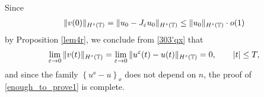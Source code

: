 Since 
\begin{equation*}
	\label{303''qx}
	\begin{split}
		\|v(0)\|_{H^s(\mathbb{T})} = \|u_0 - J_\varepsilon u_0 \|_{H^s(\mathbb{T})} \le
		\|u_0\|_{H^s(\mathbb{T})} \cdot o(1)
	\end{split}
\end{equation*}
by Proposition \ref{lem4r}, we conclude from \eqref{303'qx} that
\begin{equation}
	\label{304qx}
	\begin{split}
		\lim_{\varepsilon \to 0} \|v(t)\|_{H^s(\mathbb{T})} = \lim_{\varepsilon \to 0}
		\|u^\varepsilon(t) - u(t)\|_{H^s(\mathbb{T})}= 0, \qquad |t| \le T,
	\end{split}
\end{equation}
and since the family $\left\{ u^\ee - u \right\}_\ee$ does not depend on $n$,
the proof of \eqref{enough_to_prove1} is complete. 
%
%
%
%
%
%
%
%
